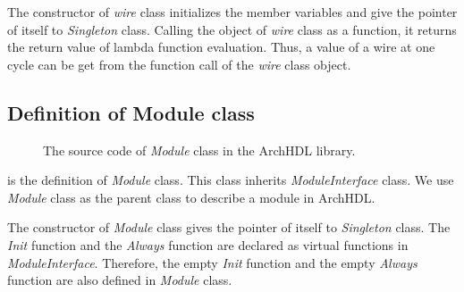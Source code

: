 The constructor of \textit{wire} class initializes the member variables and give the pointer of itself to \textit{Singleton} class.
Calling the object of \textit{wire} class as a function, it returns the return value of lambda function evaluation.
Thus, a value of a wire at one cycle can be get from the function call of the \textit{wire} class object.

\subsection{Definition of Module class}

\begin{figure}[t]
 
 \caption{The source code of \textit{Module} class in the ArchHDL library.}
 \label{src:module}
\end{figure}

 is the definition of \textit{Module} class.
This class inherits \textit{ModuleInterface} class.
We use \textit{Module} class as the parent class to describe a module in ArchHDL.

The constructor of \textit{Module} class gives the pointer of itself to \textit{Singleton} class.
The \textit{Init} function and the \textit{Always} function are declared as virtual functions in \textit{ModuleInterface}.
Therefore, the empty \textit{Init} function and the empty \textit{Always} function are also defined in \textit{Module} class.
